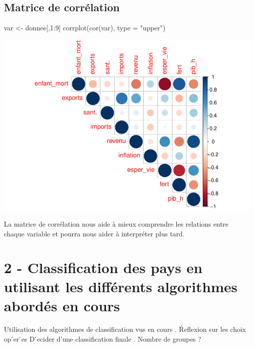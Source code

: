 \documentclass[
]{article}
\newenvironment{Shaded}{}{}
\newcommand{\AttributeTok}[1]{#1}
\newcommand{\DecValTok}[1]{#1}
\newcommand{\FunctionTok}[1]{#1}
\newcommand{\NormalTok}[1]{#1}
\newcommand{\OtherTok}[1]{\textcolor[rgb]{1.00,0.25,0.00}{#1}}
\newcommand{\SpecialCharTok}[1]{\textcolor[rgb]{0.00,0.50,0.50}{#1}}
\newcommand{\StringTok}[1]{\textcolor[rgb]{0.00,0.50,0.50}{#1}}
\begin{document}
\hypertarget{matrice-de-corruxe9lation}{%
\subsection{Matrice de corrélation}\label{matrice-de-corruxe9lation}}

\begin{Shaded}
\begin{Highlighting}[]
\NormalTok{var }\OtherTok{\textless{}{-}}\NormalTok{ donnee[,}\DecValTok{1}\SpecialCharTok{:}\DecValTok{9}\NormalTok{]}
\FunctionTok{corrplot}\NormalTok{(}\FunctionTok{cor}\NormalTok{(var), }\AttributeTok{type =} \StringTok{"upper"}\NormalTok{)}
\end{Highlighting}
\end{Shaded}

\includegraphics{projet_classification_files/figure-latex/unnamed-chunk-8-1.pdf}

La matrice de corrélation nous aide à mieux comprendre les relations
entre chaque variable et pourra nous aider à interpréter plus tard.

\hypertarget{classification-des-pays-en-utilisant-les-diffuxe9rents-algorithmes-aborduxe9s-en-cours}{%
\section{2 - Classification des pays en utilisant les différents
algorithmes abordés en
cours}\label{classification-des-pays-en-utilisant-les-diffuxe9rents-algorithmes-aborduxe9s-en-cours}}

Utilisation des algorithmes de classification vus en cours . Ŕeflexion
sur les choix op ́er ́es D ́ecider d'une classification finale . Nombre
de groupes ?
\end{document}

